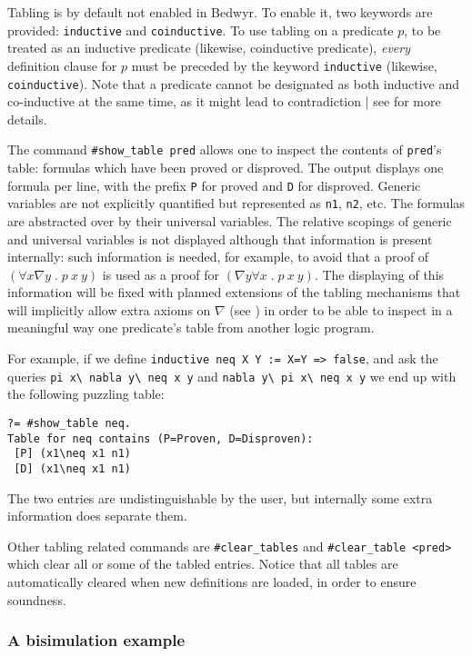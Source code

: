 \documentclass{article}
\newcommand{\qs}{\; . \;}
\begin{document}
Tabling is by default not enabled in Bedwyr. To enable it, two keywords
are provided: \texttt{inductive} and \texttt{coinductive}.
To use tabling on a predicate $p$, to be treated as an inductive predicate
(likewise, coinductive predicate), {\em every} definition clause for $p$
must be preceded by the keyword \texttt{inductive}
(likewise, \texttt{coinductive}).
Note that a predicate cannot be designated as both inductive and co-inductive
at the same time, as it might lead to contradiction
| see \cite{momigliano03types} for more details.

The command \verb/#show_table pred/ allows one to inspect the contents of
\verb.pred.'s table: formulas which have been proved or disproved.
The output displays one formula per line, with the prefix \verb.P. for proved
and \verb.D. for disproved. Generic variables are not explicitly
quantified but represented as \verb.n1., \verb.n2., etc. The formulas are
abstracted over by their universal variables. The relative scopings
of generic and universal variables is not displayed
although that information is present internally: such information is
needed, for example,
to avoid that a proof of $(\forall x\nabla y\qs p~x~y)$
is used as a proof for $(\nabla y\forall x\qs p~x~y)$.  The displaying
of this information will be
fixed with planned extensions of the tabling mechanisms that will
implicitly allow extra axioms on $\nabla$ (see \cite{tiu06lfmtp})
in order to be able to inspect in a meaningful way one predicate's
table from another logic program.

For example, if we define \verb.inductive neq X Y := X=Y => false.,
and ask the queries \verb.pi x\ nabla y\ neq x y.
and \verb.nabla y\ pi x\ neq x y. we end up with the following puzzling table:
\begin{verbatim}
?= #show_table neq.
Table for neq contains (P=Proven, D=Disproven):
 [P] (x1\neq x1 n1)
 [D] (x1\neq x1 n1)
\end{verbatim}
The two entries are undistinguishable by the user, but internally some
extra information does separate them.

Other tabling related commands are \verb/#clear_tables/ and
\verb/#clear_table <pred>/ which clear all or some of the tabled entries.
Notice that all tables are automatically cleared when new definitions
are loaded, in order to ensure soundness.

\subsubsection{A bisimulation example}
\end{document}
